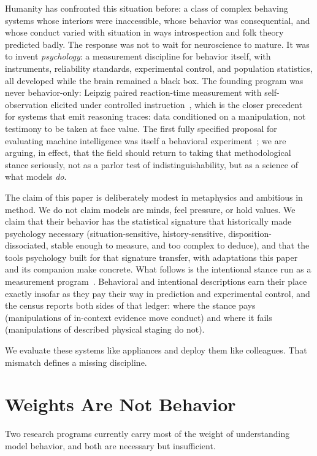 \documentclass[journal]{IEEEtran}
\begin{document}
Humanity has confronted this situation before: a class of complex
behaving systems whose interiors were inaccessible, whose behavior
was consequential, and whose conduct varied with situation in ways
introspection and folk theory predicted badly. The response was not
to wait for neuroscience to mature. It was to invent
\emph{psychology}: a measurement discipline for behavior itself, with
instruments, reliability standards, experimental control, and
population statistics, all developed while the brain remained a
black box. The founding program was never behavior-only: Leipzig
paired reaction-time measurement with self-observation elicited under
controlled instruction~\cite{wundt1874grundzuge}, which is the closer
precedent for systems that emit reasoning traces: data conditioned
on a manipulation, not testimony to be taken at face value. The first fully specified proposal for evaluating machine
intelligence was itself a behavioral experiment~\cite{turing1950computing};
we are arguing, in effect, that the field should return to taking
that methodological stance seriously, not as a parlor test of
indistinguishability, but as a science of what models \emph{do}.

The claim of this paper is deliberately modest in metaphysics and
ambitious in method. We do not claim models are minds, feel pressure,
or hold values. We claim that their behavior has the statistical
signature that historically made psychology necessary
(situation-sensitive, history-sensitive, disposition-dissociated,
stable enough to measure, and too complex to deduce), and that the
tools psychology built for that signature transfer, with adaptations
this paper and its companion make concrete. What follows is the
intentional stance run as a measurement
program~\cite{dennett1987stance}. Behavioral and intentional
descriptions earn their place exactly insofar as they pay their way
in prediction and experimental control, and the census reports both
sides of that ledger: where the stance pays (manipulations of
in-context evidence move conduct) and where it fails (manipulations
of described physical staging do not).

We evaluate these systems like appliances and deploy them like
colleagues. That mismatch defines a missing discipline.

\section{Weights Are Not Behavior}
Two research programs currently carry most of the weight of
understanding model behavior, and both are necessary but
insufficient.
\end{document}
